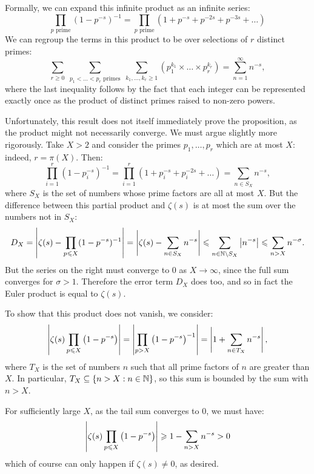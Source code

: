 \documentclass{article}
\begin{document}
\begin{prf}
    Formally, we can expand this infinite product as an infinite series:
    \[
	\prod_{p \text{ prime}}
	\left( 1 - p^{-s} \right)^{-1} =
	\prod_{p \text{ prime}}
	\left( 1 + p^{-s} + p^{-2s} + p^{-3s} + \dots \right)
	\]
	We can regroup the terms in this product to be over selections of $r$ distinct primes:
	\[
	\sum_{r \geq 0} \;
	\sum_{p_1 < \dots < p_r \text{ primes}} \;
	\sum_{k_1, \dots, k_r \geq 1}
	\left( p_1^{k_1} \times \dots \times p_r^{k_r} \right) = \sum_{n=1}^\infty n^{-s},
	\]
	where the last inequality follows by the fact that each integer can be represented exactly once as the product of distinct primes raised to non-zero powers.
	
	Unfortunately, this result does not itself immediately prove the proposition, as the product might not necessarily converge. We must argue slightly more rigorously.
	Take $X > 2$ and consider the primes $p_1, \dots, p_r$ which are at most $X$: indeed, $r = \pi(X)$. Then:
	\[
	\prod_{i=1}^r \left( 1 - p_i^{-s} \right)^{-1} =
	\prod_{i=1}^r \left( 1 + p_i^{-s} + p_i^{-2s} + \dots \right) =
	\sum_{n \in S_X} n^{-s},
	\]
	where $S_X$ is the set of numbers whose prime factors are all at most $X$. But the difference between this partial product and $\zeta(s)$ is at most the sum over the numbers not in $S_X$:
	\[
	D_X = \left\lvert \zeta(s) - \prod_{p \leqslant X} (1 - p^{-s})^{-1} \right\rvert =
	\left\lvert \zeta(s) - \sum_{n \in S_X} n^{-s} \right\rvert \leqslant
	\sum_{n \in \mathbb{N} \setminus S_X} \left\lvert  n^{-s} \right\rvert \leqslant
	\sum_{n > X} n^{-\sigma}.
	\]
	But the series on the right must converge to 0 as $X \to \infty$, since the full sum converges for $\sigma > 1$. Therefore the error term $D_X$ does too, and so in fact the Euler product is equal to $\zeta(s)$.
	
	To show that this product does not vanish, we consider:
	\[
	\left\lvert  \zeta(s) \prod_{p \leqslant X} \left( 1 - p^{-s} \right)  \right\rvert =
	\left\lvert  \prod_{p > X} \left( 1 - p^{-s} \right)^{-1}  \right\rvert =
	\left\lvert  1 + \sum_{n \in T_X} n^{-s}  \right\rvert,
	\]
	where $T_X$ is the set of numbers $n$ such that all prime factors of $n$ are greater than $X$. In particular, $T_X \subseteq \left\lbrace n > X : n \in \mathbb{N} \right\rbrace$, so this sum is bounded by the sum with $n > X$.
	
	For sufficiently large $X$, as the tail sum converges to 0, we must have:
	\[
	\left\lvert  \zeta(s) \prod_{p \leqslant X} \left( 1 - p^{-s} \right)  \right\rvert \geqslant
	1 - \sum_{n > X} n^{-s} > 0
	\]
	which of course can only happen if $\zeta(s) \neq 0$, as desired.
\end{prf}
\end{document}
